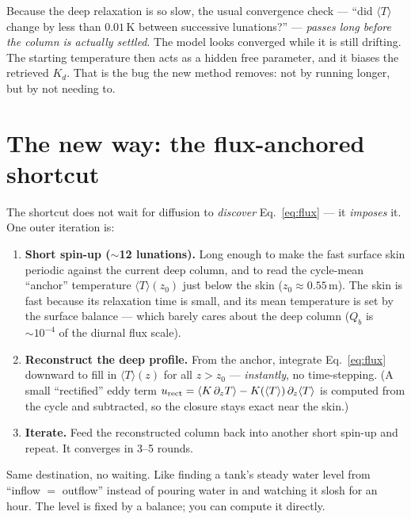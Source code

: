 \documentclass[11pt]{article}
\newcommand{\Tm}{\langle T\rangle}
\begin{document}
\begin{tcolorbox}[colback=coral!6,colframe=coral!55,boxrule=0.6pt,arc=2pt,
  title={\sffamily\bfseries The old trap (audit flag F1)},coltitle=coral,fonttitle=\small]
Because the deep relaxation is so slow, the usual convergence check ---
``did $\Tm$ change by less than $0.01$\,K between successive lunations?'' ---
\emph{passes long before the column is actually settled}. The model looks
converged while it is still drifting. The starting temperature then acts as a
hidden free parameter, and it biases the retrieved $K_d$. That is the bug the
new method removes: not by running longer, but by not needing to.
\end{tcolorbox}

\section{The new way: the flux-anchored shortcut}

The shortcut does not wait for diffusion to \emph{discover}
Eq.~\eqref{eq:flux} --- it \emph{imposes} it. One outer iteration is:

\begin{enumerate}[leftmargin=1.6em,itemsep=3pt]
\item \textbf{Short spin-up ($\sim$12 lunations).} Long enough to make the
fast surface skin periodic against the current deep column, and to read the
cycle-mean ``anchor'' temperature $\Tm(z_0)$ just below the skin
($z_0\approx0.55$\,m). The skin is fast because its relaxation time is small,
and its mean temperature is set by the surface balance --- which barely cares
about the deep column ($Q_b$ is $\sim10^{-4}$ of the diurnal flux scale).
\item \textbf{Reconstruct the deep profile.} From the anchor, integrate
Eq.~\eqref{eq:flux} downward to fill in $\Tm(z)$ for all $z>z_0$ ---
\emph{instantly}, no time-stepping. (A small ``rectified'' eddy term
$u_{\rm rect}=\langle K\,\partial_zT\rangle-K(\Tm)\,\partial_z\Tm$ is computed
from the cycle and subtracted, so the closure stays exact near the skin.)
\item \textbf{Iterate.} Feed the reconstructed column back into another short
spin-up and repeat. It converges in 3--5 rounds.
\end{enumerate}

\begin{plain}
Same destination, no waiting. Like finding a tank's steady water level from
``inflow $=$ outflow'' instead of pouring water in and watching it slosh for
an hour. The level is fixed by a balance; you can compute it directly.
\end{plain}
\end{document}
